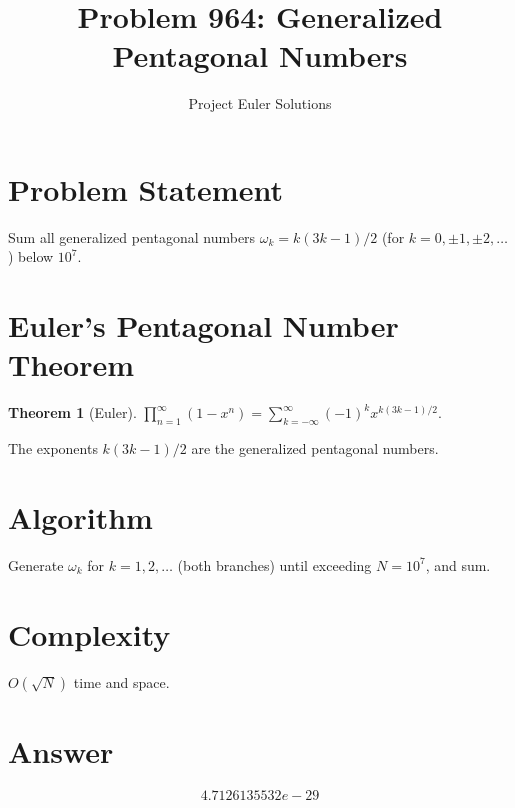 \documentclass[11pt]{article}
\title{Problem 964: Generalized Pentagonal Numbers}
\author{Project Euler Solutions}
\date{}
\newtheorem{theorem}{Theorem}
\begin{document}
\maketitle
\section{Problem Statement}
Sum all generalized pentagonal numbers $\omega_k = k(3k-1)/2$ (for $k = 0, \pm1, \pm2, \ldots$) below $10^7$.

\section{Euler's Pentagonal Number Theorem}
\begin{theorem}[Euler]
$\displaystyle\prod_{n=1}^{\infty}(1-x^n) = \sum_{k=-\infty}^{\infty} (-1)^k x^{k(3k-1)/2}.$
\end{theorem}

The exponents $k(3k-1)/2$ are the generalized pentagonal numbers.

\section{Algorithm}
Generate $\omega_k$ for $k = 1, 2, \ldots$ (both branches) until exceeding $N = 10^7$, and sum.

\section{Complexity}
$O(\sqrt{N})$ time and space.

\section{Answer}

\[
\boxed{4.7126135532e-29}
\]
\end{document}
